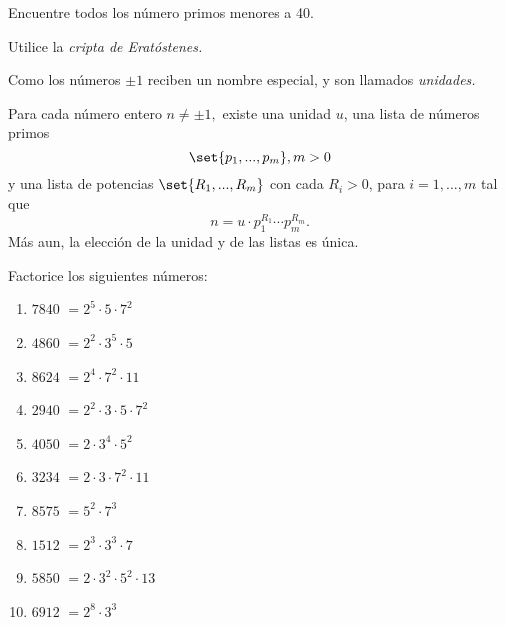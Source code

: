  
 
 	\begin{problema}
 		Encuentre todos los número primos menores a 40.
 		\begin{sugerencia}
 			Utilice la \emph{cripta de Erat\'ostenes.}
 		\end{sugerencia}
 		
 	\end{problema}
 	
 
 
 
 	Como los números \emph{$\pm 1$} reciben un nombre especial, y son llamados \emph{unidades.}
 
 
 
 
 	\begin{teorema}
 		Para cada número entero $n\neq \pm 1,$ existe una unidad $u$, una lista de números primos $$\set{ p_{1},...,p_{m}}, m>0$$ y una lista de potencias $\set{R_{1},...,R_{m}}$ con cada $R_{i}>0$, para $ i=1,...,m$ tal que 
 		$$
 		n=u\cdot p_{1}^{R_{1}}\cdots p_{m}^{R_{m}}.
 		$$
 		Más aun, la elecci\'on de la unidad y de las listas es única. 
 	\end{teorema}
 	
 
 
 
 	\begin{problema}
 		Factorice los siguientes números:
 		\begin{multicols}{2}
 			\begin{enumerate}
 				\item $7840$  $=2^{5}\cdot5\cdot7^{2}$
 				\item $4860$  $=2^{2}\cdot 3^{5} \cdot 5$
 				\item $8624$  $=2^{4}\cdot 7^{2}\cdot 11$
 				\item $2940$  
 				$=2^{2}\cdot 3 \cdot 5 \cdot 7^{2}$
 				\item $4050$ 
 				$= 2\cdot 3^{4} \cdot 5^{2}$
 				\item $3234$ 
 				$=2 \cdot 3 \cdot 7^{2} \cdot 11$
 				\item $8575$ 
 				$=5^{2} \cdot 7^{3}$
 				\item $1512$ 
 				$=2^{3}\cdot 3^{3} \cdot7$
 				\item $5850$ 
 				$=2\cdot 3^{2} \cdot 5^{2} \cdot 13$
 				\item $6912$
 				$=2^{8}\cdot 3^{3}$
 			\end{enumerate}
 			
 			
 		\end{multicols}
 		
 		
 	\end{problema}
 	
